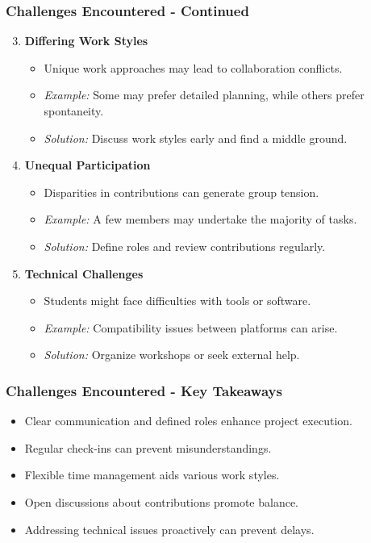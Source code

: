 \documentclass[aspectratio=169]{beamer}
\begin{document}
\begin{frame}[fragile]
  \frametitle{Challenges Encountered - Continued}
  \begin{enumerate}
    \setcounter{enumi}{2} %
    \item \textbf{Differing Work Styles}
      \begin{itemize}
        \item Unique work approaches may lead to collaboration conflicts.
        \item \textit{Example:} Some may prefer detailed planning, while others prefer spontaneity.
        \item \textit{Solution:} Discuss work styles early and find a middle ground.
      \end{itemize}

    \item \textbf{Unequal Participation}
      \begin{itemize}
        \item Disparities in contributions can generate group tension.
        \item \textit{Example:} A few members may undertake the majority of tasks.
        \item \textit{Solution:} Define roles and review contributions regularly.
      \end{itemize}

    \item \textbf{Technical Challenges}
      \begin{itemize}
        \item Students might face difficulties with tools or software.
        \item \textit{Example:} Compatibility issues between platforms can arise.
        \item \textit{Solution:} Organize workshops or seek external help.
      \end{itemize}
  \end{enumerate}
\end{frame}

\begin{frame}[fragile]
  \frametitle{Challenges Encountered - Key Takeaways}
  \begin{itemize}
    \item Clear communication and defined roles enhance project execution.
    \item Regular check-ins can prevent misunderstandings.
    \item Flexible time management aids various work styles.
    \item Open discussions about contributions promote balance.
    \item Addressing technical issues proactively can prevent delays.
  \end{itemize}
\end{frame}
\end{document}
